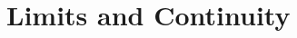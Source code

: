 \documentclass[class=mike-apostol-mathematical-analysis,crop=false]{standalone}
\begin{document}
\chapter{Limits and Continuity}
\end{document}
